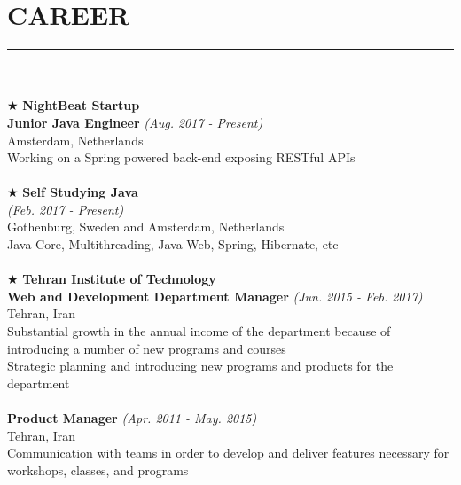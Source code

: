 \documentclass[10pt,a4paper]{article}
\begin{document}
\section{CAREER}
\noindent\rule {18.0cm}{0.2pt} \\ \\
$\bigstar$ \hspace{0.1cm} \large \textbf{NightBeat Startup} \\
\indent \small \textbf{Junior Java Engineer} \textsl{(Aug. 2017 - Present)} \\
\indent \textnormal{Amsterdam, Netherlands} \\
\indent \textbullet \hspace{0.05cm} Working on a Spring powered back-end exposing RESTful APIs \\
\\
$\bigstar$ \hspace{0.1cm} \large \textbf{Self Studying Java} \\
\indent \small \textsl{(Feb. 2017 - Present)} \\
\indent \textnormal{Gothenburg, Sweden and Amsterdam, Netherlands} \\
\indent \textbullet \hspace{0.05cm} Java Core, Multithreading, Java Web, Spring, Hibernate, etc \\
\\
$\bigstar$ \hspace{0.1cm} \large \textbf{Tehran Institute of Technology} \\
\indent \small \textbf{Web and Development Department Manager} \textsl{(Jun. 2015 - Feb. 2017)} \\
\indent \textnormal{Tehran, Iran} \\
\indent \textbullet \hspace{0.05cm} Substantial growth in the annual income of the department because of introducing a number of new programs and courses \\
\indent \textbullet \hspace{0.05cm} Strategic planning and introducing new programs and products for the department \\
\\
\indent \small \textbf{Product Manager} \textsl{(Apr. 2011 - May. 2015)} \\
\indent \textnormal{Tehran, Iran} \\
\indent \textbullet \hspace{0.05cm} Communication with teams in order to develop and deliver features necessary for workshops, classes, and programs \\
\end{document}
